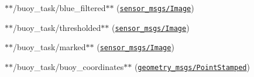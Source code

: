 \begin{DoxyItemize}
\item $\ast$$\ast${\ttfamily /buoy\+\_\+task/blue\+\_\+filtered}$\ast$$\ast$ (\href{http://docs.ros.org/api/sensor_msgs/html/msg/Image.html}{\tt sensor\+\_\+msgs/\+Image})
\item $\ast$$\ast${\ttfamily /buoy\+\_\+task/thresholded}$\ast$$\ast$ (\href{http://docs.ros.org/api/sensor_msgs/html/msg/Image.html}{\tt sensor\+\_\+msgs/\+Image})
\item $\ast$$\ast${\ttfamily /buoy\+\_\+task/marked}$\ast$$\ast$ (\href{http://docs.ros.org/api/sensor_msgs/html/msg/Image.html}{\tt sensor\+\_\+msgs/\+Image})
\item $\ast$$\ast${\ttfamily /buoy\+\_\+task/buoy\+\_\+coordinates}$\ast$$\ast$ (\href{http://docs.ros.org/kinetic/api/geometry_msgs/html/msg/PointStamped.html}{\tt geometry\+\_\+msgs/\+Point\+Stamped})
\end{DoxyItemize}


